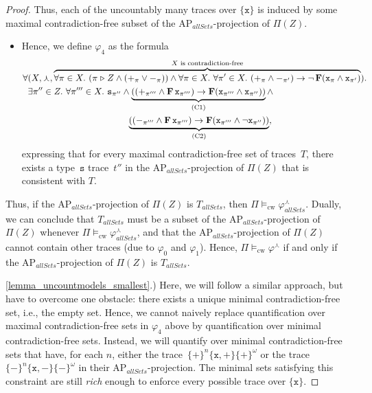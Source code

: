 \documentclass[dvipsnames,10pt,a4paper]{amsart}
\theoremstyle{definition}
\theoremstyle{remark}
\renewcommand{\phi}{\varphi}
\newcommand{\set}[1]{\{#1\}}
\newcommand{\F}{\mathop{\mathbf{F}\vphantom{a}}\nolimits}
\newcommand{\ap}[0]{\mathrm{AP}}
\newcommand{\largest}{\curlywedge}
\newcommand{\posprop}{\mathtt{+}}
\newcommand{\negprop}{\mathtt{-}}
\newcommand{\setprop}{\mathtt{s}}
\newcommand{\inprop}{\mathtt{x}}
\newcommand{\allsets}{{\mathit{allSets}}}
\newcommand{\tracein}{\mathrel{\triangleright}}
\newcommand{\cw}{\mathrm{cw}}
\begin{document}
\begin{proof}
Thus, each of the uncountably many traces over $\set{\inprop}$ is induced by some maximal contradiction-free subset of the $\ap_\allsets$-projection of $\Pi(Z)$.
\begin{itemize}
\item Hence, we define $\phi_4$ as the formula
\begin{align*}
\forall {}&{}(X, \largest, \overbrace{\forall \pi \in X.\ (\pi\tracein Z \wedge (\posprop_\pi \vee \negprop_\pi)) \wedge \forall \pi \in X.\ \forall \pi' \in X.\ (\posprop_\pi \wedge \negprop_{\pi'}) \rightarrow \neg \F(\inprop_{\pi} \wedge \inprop_{\pi'}) }^{\text{$X$ is contradiction-free}}).\\
&{}\exists \pi'' \in Z.\ \forall \pi''' \in X.\ \setprop_{\pi''} \wedge  \underbrace{((\posprop_{\pi'''}\wedge \F\inprop_{\pi'''}) \rightarrow \F(\inprop_{\pi'''} \wedge \inprop_{\pi''}))}_{\text{(C1)}}
\wedge \\
&{}\phantom{\exists \pi'' \in Z.\ \forall \pi''' \in X.\ \setprop_{\pi''} \wedge  }\underbrace{((\negprop_{\pi'''} \wedge \F\inprop_{\pi'''}) \rightarrow \F(\inprop_{\pi'''} \wedge \neg\inprop_{\pi''}))}_{\text{(C2)}},
\end{align*} 
expressing that for every maximal contradiction-free set of traces~$T$, there exists a type~$\setprop$ trace~$t''$ in the $\ap_\allsets$-projection of $\Pi(Z)$ that is consistent with $T$.
\end{itemize}

Thus, if the $\ap_\allsets$-projection of $\Pi(Z)$ is $T_\allsets$, then $\Pi\models_\cw\phi_\allsets^\largest$.
Dually, we can conclude that $T_\allsets$ must be a subset of the $\ap_\allsets$-projection of $\Pi(Z)$ whenever $\Pi\models_\cw \phi_\allsets^\largest$, and that the $\ap_\allsets$-projection of $\Pi(Z)$ cannot contain other traces (due to $\phi_0$ and $\phi_1$).
Hence, $\Pi \models_\cw \varphi^\largest$ if and only if the $\ap_\allsets$-projection of $\Pi(Z)$ is $T_\allsets$.

\ref{lemma_uncountmodels_smallest}.)
Here, we will follow a similar approach, but have to overcome one obstacle: there exists a unique minimal contradiction-free set, i.e., the empty set.
Hence, we cannot naively replace quantification over maximal contradiction-free sets in $\phi_4$ above by quantification over minimal contradiction-free sets. 
Instead, we will quantify over minimal contradiction-free sets that have, for each $n$, either the trace~$\set{\posprop}^n \set{\inprop,\posprop} \set{\posprop}^\omega$ or the trace~$\set{\negprop}^n \set{\inprop,\negprop} \set{\negprop}^\omega$ in their $\ap_\allsets$-projection. 
The minimal sets satisfying this constraint are still \emph{rich} enough to enforce every possible trace over $\set{\inprop}$.


\end{proof}
\end{document}
